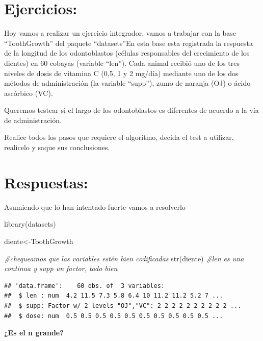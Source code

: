 \documentclass[
]{book}
\newenvironment{Shaded}{\begin{snugshade}}{\end{snugshade}}
\newcommand{\CommentTok}[1]{\textcolor[rgb]{0.56,0.35,0.01}{\textit{#1}}}
\newcommand{\FunctionTok}[1]{\textcolor[rgb]{0.00,0.00,0.00}{#1}}
\newcommand{\NormalTok}[1]{#1}
\newcommand{\OtherTok}[1]{\textcolor[rgb]{0.56,0.35,0.01}{#1}}
\begin{document}
\hypertarget{ejercicios-6}{%
\section{\texorpdfstring{ Ejercicios:}{ Ejercicios:}}\label{ejercicios-6}}

Hoy vamos a realizar un ejercicio integrador, vamos a trabajar con la base ``ToothGrowth'' del paquete ``datasets''En esta base esta registrada la respuesta de la longitud de los odontoblastos (células responsables del crecimiento de los dientes) en 60 cobayas (variable ``len''). Cada animal recibió uno de los tres niveles de dosis de vitamina C (0,5, 1 y 2 mg/día) mediante uno de los dos métodos de administración (la variable ``supp''), zumo de naranja (OJ) o ácido ascórbico (VC).

Queremos testear si el largo de los odontoblastos es diferentes de acuerdo a la vía de administración.

Realice todos los pasos que requiere el algoritmo, decida el test a utilizar, realícelo y saque sus conclusiones.

\hypertarget{respuestas-4}{%
\section{\texorpdfstring{ Respuestas:}{ Respuestas:}}\label{respuestas-4}}

Asumiendo que lo han intentado fuerte vamos a resolverlo

\begin{Shaded}
\begin{Highlighting}[]
\FunctionTok{library}\NormalTok{(datasets)}

\NormalTok{diente}\OtherTok{\textless{}{-}}\NormalTok{ToothGrowth}


\CommentTok{\#chequeamos que las variables estén bien codificadas}
\FunctionTok{str}\NormalTok{(diente) }\CommentTok{\#len es una continua y supp un factor, todo bien}
\end{Highlighting}
\end{Shaded}

\begin{verbatim}
## 'data.frame':    60 obs. of  3 variables:
##  $ len : num  4.2 11.5 7.3 5.8 6.4 10 11.2 11.2 5.2 7 ...
##  $ supp: Factor w/ 2 levels "OJ","VC": 2 2 2 2 2 2 2 2 2 2 ...
##  $ dose: num  0.5 0.5 0.5 0.5 0.5 0.5 0.5 0.5 0.5 0.5 ...
\end{verbatim}

\textbf{¿Es el n grande?}
\end{document}

